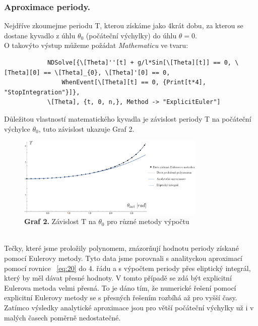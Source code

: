\documentclass[reqno, a4paper]{amsart}
\begin{document}
		\subsubsection{Aproximace periody.} Nejdříve zkoumejme periodu T, kterou získáme jako 4krát dobu, za kterou se dostane kyvadlo z úhlu $\theta_{0}$ (počáteční výchylky) do úhlu $\theta=0$. 
		\\
		O takovýto výstup můžeme požádat \textit{Mathematicu} ve tvaru:  
		\begin{verbatim}
			NDSolve[{\[Theta]''[t] + g/l*Sin[\[Theta][t]] == 0, \[Theta][0] == \[Theta]_{0}, \[Theta]'[0] == 0, 
				WhenEvent[\[Theta][t] == 0, {Print[t*4], "StopIntegration"}]}, 
			\[Theta], {t, 0, n,}, Method -> "ExplicitEuler"]
		\end{verbatim}
		Důležitou vlastností matematického kyvadla je závislost periody T na počáteční výchylce $\theta_{0}$, tuto závislost ukazuje Graf 2.
		\begin{figure}[h]
			\centering
			\includegraphics[width=0.8\textwidth]{graf1}
			\caption*{\textbf{Graf 2.} Závislost T na $\theta_{0}$ pro různé metody výpočtu}  
		\end{figure}
		\\
		Tečky, které jsme proložily polynomem, znázorňují hodnotu periody získané pomocí Eulerovy metody. Tyto data jsme porovnali s analityckou aproximací pomocí rovnice ~\eqref{eq:20} do 4. řádu a s výpočtem periody přes eliptický integrál, který by měl dávat přesné hodnoty.
		V tomto případě se zdá být explicitní Eulerova metoda velmi přesná. To je dáno tím, že numerické řešení pomocí explicitní Eulerovy metody se s přesných řešením rozbíhá až pro vyšší časy. Zatímco výsledky analytické aproximace jsou pro větší počáteční výchylky už i v malých časech poměrně nedostatečné.
		\\
		\\
\end{document}
